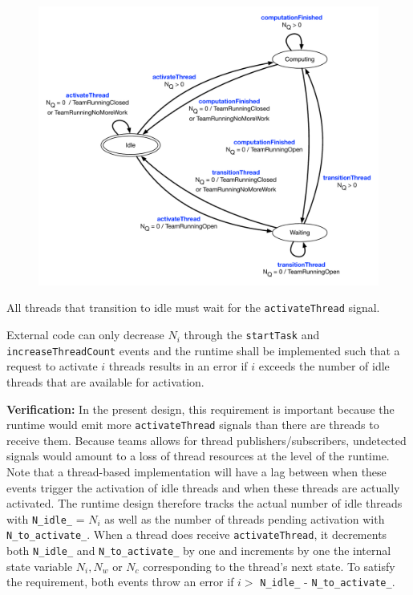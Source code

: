 \documentclass{article}
\begin{document}
\begin{figure}[!hp]
\begin{center}
\includegraphics[width=6.5in]{ThreadStatesPersistent.pdf}
\caption[]{}
\label{fig:ThreadStateDiagram}
\end{center}
\end{figure}

\begin{spec}
All threads that transition to idle must wait for the \texttt{activateThread}
signal.
\label{spec:IdleActivateThread}
\end{spec}

\begin{spec}
External code can only decrease $N_i$ through the \texttt{startTask} and
\texttt{increaseThreadCount} events and the runtime shall be implemented such
that a request to activate $i$ threads results in an error if $i$ exceeds the
number of idle threads that are available for activation.
\end{spec}
\textbf{Verification:}\hspace{0.125in}  In the present design, this requirement
is important because the runtime would emit more \texttt{activateThread} signals
than there are threads to receive them.  Because teams allows for thread
publishers/subscribers, undetected signals would amount to a loss of thread
resources at the level of the runtime.  Note that a thread-based implementation
will have a lag between when these events trigger the activation of idle threads
and when these threads are actually activated.  The runtime design therefore
tracks the actual number of idle threads with \texttt{N\_idle\_} = $N_i$ as well
as the number of threads pending activation with \texttt{N\_to\_activate\_}.
When a thread does receive \texttt{activateThread}, it decrements both
\texttt{N\_idle\_} and \texttt{N\_to\_activate\_} by one and increments by one
the internal state variable $N_i, N_w$ or $N_c$ corresponding to the thread's
next state.  To satisfy the requirement, both events throw an error if $i > $
\texttt{N\_idle\_} - \texttt{N\_to\_activate\_}.
\end{document}

